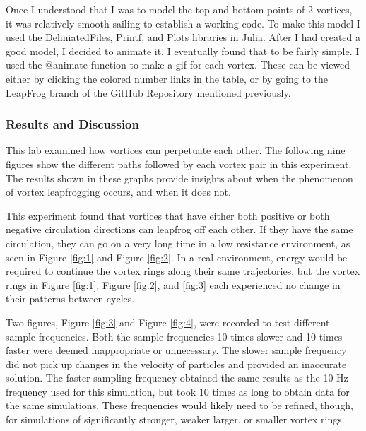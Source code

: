 \documentclass{article}
\begin{document}
Once I understood that I was to model the top and bottom points of 2 vortices, it was relatively smooth sailing to establish a working code. To make this model I used the DeliniatedFiles, Printf, and Plots libraries in Julia. After I had created a good model, I decided to animate it. I eventually found that to be fairly simple. I used the \textcolor{Dandelion}{@animate} function to make a gif for each vortex. These can be viewed either by clicking the colored number links in the table, or by going to the LeapFrog branch of the \href{https://github.com/JoeSpencer1/497R-Projects.git}{GitHub Repository} mentioned previously. \newline

\subsubsection*{Results and Discussion}

This lab examined how vortices can perpetuate each other. The following nine figures show the different paths followed by each vortex pair in this experiment. The results shown in these graphs provide insights about when the phenomenon of vortex leapfrogging occurs, and when it does not.\newline

This experiment found that vortices that have either both positive or both negative circulation directions can leapfrog off each other. If they have the same circulation, they can go on a very long time in a low resistance environment, as seen in Figure \ref{fig:1} and Figure \ref{fig:2}. In a real environment, energy would be required to continue the vortex rings along their same trajectories, but the vortex rings in Figure \ref{fig:1}, Figure \ref{fig:2}, and \ref{fig:3} each experienced no change in their patterns between cycles. \newline

Two figures, Figure \ref{fig:3} and Figure \ref{fig:4}, were recorded to test different sample frequencies. Both the sample frequencies 10 times slower and 10 times faster were deemed inappropriate or unnecessary. The slower sample frequency did not pick up changes in the velocity of particles and provided an inaccurate solution. The faster sampling frequency obtained the same results as the 10 Hz frequency used for this simulation, but took 10 times as long to obtain data for the same simulations. These frequencies would likely need to be refined, though, for simulations of significantly stronger, weaker larger. or smaller vortex rings. \newline
\end{document}
